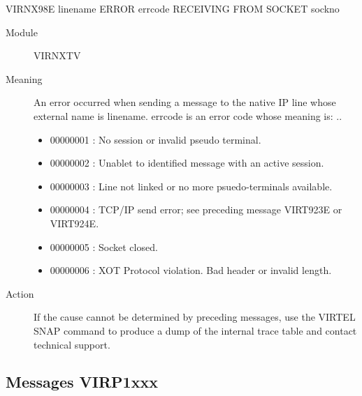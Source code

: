 \documentclass[letterpaper,10pt,english]{sphinxmanual}
\begin{document}
VIRNX98E linename ERROR errcode RECEIVING FROM SOCKET sockno
\begin{description}
\item[{Module}] \leavevmode
VIRNXTV

\item[{Meaning}] \leavevmode
An error occurred when sending a message to the native IP line whose external name is linename. errcode is an error code whose meaning is:
..
\begin{itemize}
\item {} 
00000001 : No session or invalid pseudo terminal.

\item {} 
00000002 : Unablet to identified message with an active session.

\item {} 
00000003 : Line not linked or no more psuedo-terminals available.

\item {} 
00000004 : TCP/IP send error; see preceding message VIRT923E or VIRT924E.

\item {} 
00000005 : Socket closed.

\item {} 
00000006 : XOT Protocol violation. Bad header or invalid length.

\end{itemize}

\item[{Action}] \leavevmode
If the cause cannot be determined by preceding messages, use the VIRTEL SNAP command to produce a dump of the internal trace table and contact technical support.

\end{description}


\subsection{Messages VIRP1xxx}
\label{\detokenize{messages:messages-virp1xxx}}
\end{document}
